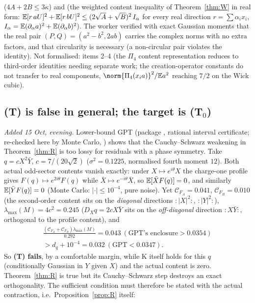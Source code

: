  ($4A+2B\le3\kappa$) and  (the weighted content inequality of Theorem~\ref{thm:W} in real form:
$\mathbb E[r\,aU]^2+\mathbb E[r\,bU]^2\le(2\sqrt A+\sqrt B)^2\,I_\alpha$ for every real direction $r=\sum\alpha_ix_i$, $I_\alpha=\mathbb E(\partial_\alpha a)^2+\mathbb E(\partial_\alpha b)^2$). The worker verified
with exact Gaussian moments that the real pair $(P,Q)=(a^2-b^2,2ab)$ carries the complex norms with no extra factors, and that circularity is necessary (a non-circular pair violates
the identity). Not formalised: items 2--4 (the $\Pi_4$ content representation reduces to third-order identities needing separate work; the creation-operator constants do not transfer
to real components, $\norm{\Pi_4(x_ia)}^2/\E a^2$ reaching $7/2$ on the Wick cubic).

\subsection{(T) is false in general; the target is (T$_0$)}\label{sec:wct-false}
\emph{Added 15 Oct, evening.} Lower-bound GPT (package , rational interval certificate; re-checked here by Monte Carlo, ) shows that the
Cauchy--Schwarz weakening in Theorem~\ref{thm:R} is too lossy for residuals with a phase symmetry. Take $q=cX^2\bar Y$, $c=7/(20\sqrt2)$ ($\sigma^2=0.1225$, normalised fourth moment $12$).
Both actual odd-sector contents vanish exactly: under $X\mapsto e^{i\theta}X$ the charge-one profile gives $F(q)\mapsto e^{2i\theta}F(q)$ while $\bar X\mapsto e^{-i\theta}\bar X$, so
$\mathbb E[\bar XF(q)]=0$, and similarly $\mathbb E[\bar YF(q)]=0$ (Monte Carlo: $|\cdot|\le10^{-4}$, pure noise). Yet $\mathcal C_{F_A}=0.041$, $\mathcal C_{F_B}=0.010$ (the second-order content sits on the
\emph{diagonal} directions ${:}|X|^2{:}$, ${:}|Y|^2{:}$), $\lambda_{\max}(M)=4c^2=0.245$ ($D_Xq=2cX\bar Y$ sits on the \emph{off-diagonal} direction ${:}X\bar Y{:}$, orthogonal to the
profile content), and
\[\begin{gathered}
\frac{(\mathcal C_{F_A}+\mathcal C_{F_B})\lambda_{\max}(M)}{0.292}=0.043\ (\text{GPT's enclosure}>0.0354)\\
{}>d_q+10^{-4}=0.032\ (\text{GPT}<0.0347).
\end{gathered}\]
So \textbf{(T) fails}, by a comfortable margin, while K itself holds for this $q$ (conditionally Gaussian in $Y$ given $X$) and the actual content is zero. Theorem~\ref{thm:R} is true but
its Cauchy--Schwarz step destroys an exact orthogonality. The sufficient condition must therefore be stated with the actual contraction, i.e.\ Proposition~\ref{prop:R} itself:
